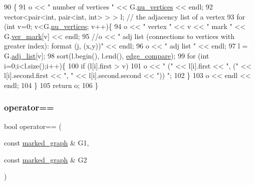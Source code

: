 \begin{DoxyCode}
90 \{
91   o << \textcolor{stringliteral}{" number of vertices "} << G.\hyperlink{classmarked__graph_acf79c6aeb8f32614cb14a5baaa6c9f9b}{nu\_vertices} << endl;
92   vector<pair<int, pair<int, int> > > l; \textcolor{comment}{// the adjacency list of a vertex}
93   \textcolor{keywordflow}{for} (\textcolor{keywordtype}{int} v=0; v<G.\hyperlink{classmarked__graph_acf79c6aeb8f32614cb14a5baaa6c9f9b}{nu\_vertices}; v++)\{
94     o << \textcolor{stringliteral}{" vertex "} << v << \textcolor{stringliteral}{" mark "} << G.\hyperlink{classmarked__graph_ac83e9377dd4d8bb95be1ac949b127296}{ver\_mark}[v] << endl;
95     \textcolor{comment}{//o << " adj list (connections to vertices with greater index): format (j, (x,y))" << endl;}
96     o << \textcolor{stringliteral}{" adj list "} << endl;
97     l = G.\hyperlink{classmarked__graph_a1a0bf7ca413a278763f7c878b3b6fd6f}{adj\_list}[v];
98     sort(l.begin(), l.end(), \hyperlink{marked__graph_8cpp_a09dd24caed50b1d106e10538e688b6ac}{edge\_compare});
99     \textcolor{keywordflow}{for} (\textcolor{keywordtype}{int} i=0;i<l.size();i++)\{
100       \textcolor{keywordflow}{if} (l[i].first > v)
101         o << \textcolor{stringliteral}{" ("} << l[i].first << \textcolor{stringliteral}{", ("} << l[i].second.first << \textcolor{stringliteral}{", "} << l[i].second.second << \textcolor{stringliteral}{")) "};
102     \}
103     o << endl << endl;
104   \}
105   \textcolor{keywordflow}{return} o;
106 \}
\end{DoxyCode}
\mbox{\label{classmarked__graph_a1718b82e881f8c37552018df1f83f82c}} 
\subsubsection{\texorpdfstring{operator==}{operator==}}
{\footnotesize\ttfamily bool operator== (\begin{DoxyParamCaption}\item[{const \hyperlink{classmarked__graph}{marked\+\_\+graph} \&}]{G1,  }\item[{const \hyperlink{classmarked__graph}{marked\+\_\+graph} \&}]{G2 }\end{DoxyParamCaption})\hspace{0.3cm}{\ttfamily [friend]}}



